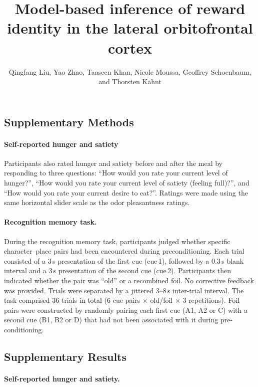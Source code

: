 \documentclass[9pt,twoside,lineno]{pnas-new}
\title{Model-based inference of reward identity in the lateral orbitofrontal cortex}
\author{Qingfang Liu, Yao Zhao, Taaseen Khan, Nicole Moussa, Geoffrey Schoenbaum, and Thorsten Kahnt}
\begin{document}
\maketitle
\SItext

\subsection*{Supplementary Methods}

\paragraph*{Self-reported hunger and satiety}

Participants also rated hunger and satiety before and after the meal by responding to three questions: “How would you rate your current level of hunger?”, “How would you rate your current level of satiety (feeling full)?”, and “How would you rate your current desire to eat?”. Ratings were made using the same horizontal slider scale as the odor pleasantness ratings.

\paragraph*{Recognition memory task.}

During the recognition memory task, participants judged whether specific character--place pairs had been encountered during preconditioning. Each trial consisted of a 3\,s presentation of the first cue (cue\,1), followed by a 0.3\,s blank interval and a 3\,s presentation of the second cue (cue\,2). Participants then indicated whether the pair was ``old'' or a recombined foil. No corrective feedback was provided. Trials were separated by a jittered 3--8\,s inter-trial interval. The task comprised 36 trials in total (6 cue pairs $\times$ old/foil $\times$ 3 repetitions). Foil pairs were constructed by randomly pairing each first cue (A1, A2 or C) with a second cue (B1, B2 or D) that had not been associated with it during pre-conditioning.

\subsection*{Supplementary Results}

\paragraph*{Self-reported hunger and satiety.}
\end{document}
